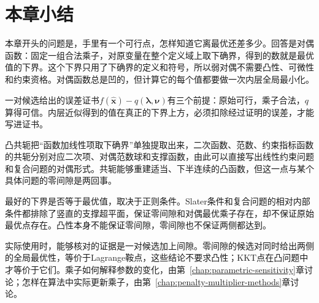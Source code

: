 \section{本章小结}
\label{sec:dual-summary}

本章开头的问题是，手里有一个可行点，怎样知道它离最优还差多少。回答是对偶函数：固定一组合法乘子，对原变量在整个定义域上取下确界，得到的数就是最优值的下界。这个下界只用了下确界的定义和符号，所以弱对偶不需要凸性、可微性和约束资格。对偶函数总是凹的，但计算它的每个值都要做一次内层全局最小化。

一对候选给出的误差证书$f(\hat{\bm{x}})-q(\bm{\lambda},\bm{\nu})$有三个前提：原始可行，乘子合法，$q$算得可信。内层近似得到的值在真正的下界上方，必须扣除经过证明的误差，才能写进证书。

凸共轭把“函数加线性项取下确界”单独提取出来，二次函数、范数、约束指标函数的共轭分别对应二次项、对偶范数球和支撑函数，由此可以直接写出线性约束问题和复合问题的对偶形式。共轭能够重建适当、下半连续的凸函数，但这一点与某个具体问题的零间隙是两回事。

最好的下界是否等于最优值，取决于正则条件。Slater条件和复合问题的相对内部条件都排除了竖直的支撑超平面，保证零间隙和对偶最优乘子存在，却不保证原始最优点存在。凸性本身不能保证零间隙，零间隙也不保证两侧都达到。

实际使用时，能够核对的证据是一对候选加上间隙。零间隙的候选对同时给出两侧的全局最优性，等价于Lagrange鞍点，这些结论不要求凸性；KKT点在凸问题中才等价于它们。乘子如何解释参数的变化，由第~\ref{chap:parametric-sensitivity}章讨论；怎样在算法中实际更新乘子，由第~\ref{chap:penalty-multiplier-methods}章讨论。
